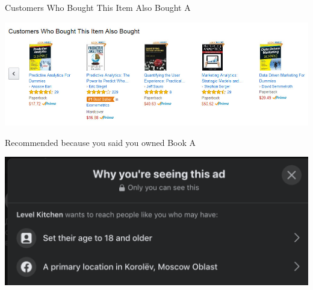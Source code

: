\documentclass[11pt,aspectratio=169]{beamer}
\begin{document}
\begin{frame}

\begin{tcolorbox}[colback=info!5,colframe=info!80,title=Collaborative]
Customers Who Bought This Item Also Bought A
\end{tcolorbox}

\vfill

\begin{center}
\includegraphics[scale=0.3]{images/amazon.jpeg}
\end{center}

\end{frame}

\begin{frame}

\begin{tcolorbox}[colback=info!5,colframe=info!80,title=Content-based]
Recommended because you said you owned Book A
\end{tcolorbox}

\vfill

\begin{center}
\includegraphics[scale=0.3]{images/facebook.png}
\end{center}

\end{frame}
\end{document}
